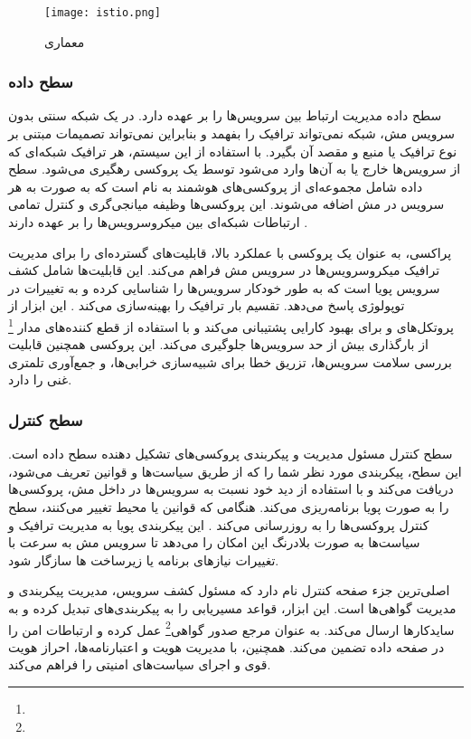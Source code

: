 \begin{figure}[t]
	\centering
	\texttt{[image: istio.png]}
	\caption{معماری }
	\label{fig: istio arch}
\end{figure}
\subsubsection{سطح داده}
سطح داده مدیریت ارتباط بین سرویس‌ها را بر عهده دارد. در یک شبکه سنتی بدون سرویس مش، شبکه نمی‌تواند ترافیک را بفهمد و بنابراین نمی‌تواند تصمیمات مبتنی بر نوع ترافیک یا منبع و مقصد آن بگیرد. با استفاده از این سیستم، هر ترافیک شبکه‌ای که از سرویس‌ها خارج یا به آن‌ها وارد می‌شود توسط یک پروکسی رهگیری می‌شود. سطح داده شامل مجموعه‌ای از پروکسی‌های هوشمند به نام  است که به صورت  به هر سرویس در مش اضافه می‌شوند. این پروکسی‌ها وظیفه میانجی‌گری و کنترل تمامی ارتباطات شبکه‌ای بین میکروسرویس‌ها را بر عهده دارند \cite{Istio2}.

 پراکسی، به عنوان یک پروکسی با عملکرد بالا، قابلیت‌های گسترده‌ای را برای مدیریت ترافیک میکروسرویس‌ها در سرویس مش فراهم می‌کند. این قابلیت‌ها شامل کشف سرویس پویا است که به طور خودکار سرویس‌ها را شناسایی کرده و به تغییرات در توپولوژی پاسخ می‌دهد. تقسیم بار ترافیک را بهینه‌سازی می‌کند \cite{Istio2}. این ابزار از پروتکل‌های  و  برای بهبود کارایی پشتیبانی می‌کند و با استفاده از قطع کننده‌های مدار \footnote{} از بارگذاری بیش از حد سرویس‌ها جلوگیری می‌کند. این پروکسی همچنین قابلیت بررسی سلامت سرویس‌ها، تزریق خطا برای شبیه‌سازی خرابی‌ها، و جمع‌آوری تلمتری غنی را دارد. 

\subsubsection{سطح کنترل}
سطح کنترل مسئول مدیریت و پیکربندی پروکسی‌های تشکیل دهنده سطح داده است. این سطح، پیکربندی مورد نظر شما را که از طریق سیاست‌ها و قوانین تعریف می‌شود، دریافت می‌کند و با استفاده از دید خود نسبت به سرویس‌ها در داخل مش، پروکسی‌ها را به صورت پویا برنامه‌ریزی می‌کند. هنگامی که قوانین یا محیط تغییر می‌کنند، سطح کنترل پروکسی‌ها را به روزرسانی می‌کند \cite{Istio2}. این پیکربندی پویا به مدیریت ترافیک و سیاست‌ها به صورت بلادرنگ این امکان را می‌دهد تا سرویس مش به سرعت با تغییرات نیازهای برنامه یا زیرساخت‌ ها سازگار شود. 

اصلی‌ترین جزء صفحه کنترل  نام دارد که مسئول کشف سرویس، مدیریت پیکربندی و مدیریت گواهی‌ها است. این ابزار، قواعد مسیریابی را به پیکربندی‌های  تبدیل کرده و به سایدکارها ارسال می‌کند.  به عنوان مرجع صدور گواهی\footnote{} عمل کرده و ارتباطات امن  را در صفحه داده تضمین می‌کند. همچنین، با مدیریت هویت و اعتبارنامه‌ها، احراز هویت قوی و اجرای سیاست‌های امنیتی را فراهم می‌کند. 

